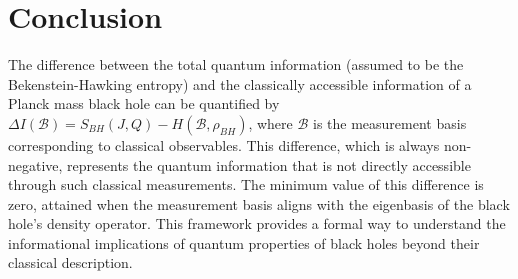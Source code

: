 	\section{Conclusion}
	
	The difference between the total quantum information (assumed to be the Bekenstein-Hawking entropy) and the classically accessible information of a Planck mass black hole can be quantified by $\Delta I(\mathcal{B}) = S_{BH}(J, Q) - H(\mathcal{B}, \rho_{BH})$, where $\mathcal{B}$ is the measurement basis corresponding to classical observables. This difference, which is always non-negative, represents the quantum information that is not directly accessible through such classical measurements. The minimum value of this difference is zero, attained when the measurement basis aligns with the eigenbasis of the black hole's density operator. This framework provides a formal way to understand the informational implications of quantum properties of black holes beyond their classical description.
	

